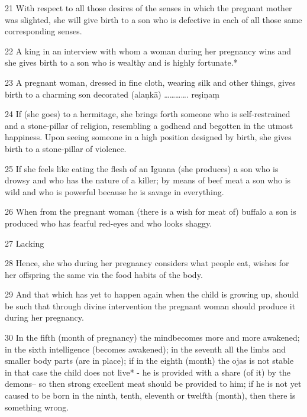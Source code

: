 \begin{translation}
\begin{tt}
\item[21]With respect to all those desires of the senses in which the pregnant 
mother was slighted, she will give birth to a son who is defective in each of all 
those same corresponding senses.

\item[22]A king in an interview with whom a woman during her pregnancy wins 
and she gives birth to a son who is wealthy and is highly fortunate.*

\item[23]A pregnant woman, dressed in fine cloth, wearing silk and other things, 
gives birth to a charming son decorated (alaṇkā) …………. reṣiṇaṃ


\item[24]If (she goes) to a hermitage, she brings forth someone who is 
self-restrained and a stone-pillar of religion, resembling a godhead and begotten 
in the utmost happiness. Upon seeing someone in a high position designed by 
birth, she gives birth to a stone-pillar of violence.

\item[25]If she feels like eating the flesh of an Iguana (she produces) a son who 
is drowsy and who has the nature of a killer; by means of beef meat a son who is 
wild and who is powerful because he is savage in everything.

\item[26] When from the pregnant woman (there is a wish for meat of) buffalo a 
son is produced who has fearful red-eyes and who looks shaggy.

\item[27]Lacking

\item[28]Hence, she who during her pregnancy considers what people eat, 
wishes for her offspring the same via the food habits of the body.

\item[29] And that which has yet to happen again when the child is growing up, 
should be such that through divine intervention the pregnant woman should 
produce it during her pregnancy. 

\item[30]In the fifth (month of pregnancy) the mindbecomes more and more 
awakened; in the sixth intelligence (becomes awakened); in the seventh all the 
limbs and smaller body parts (are in place); if in the eighth (month) the ojas is 
not stable in that case the child does not live* - he is provided with a share (of it) 
by the demons– so then strong excellent meat should be provided to him; if he is 
not yet caused to be born in the ninth, tenth, eleventh or twelfth  (month), then 
there is something wrong.


\end{tt}
\end{translation}
